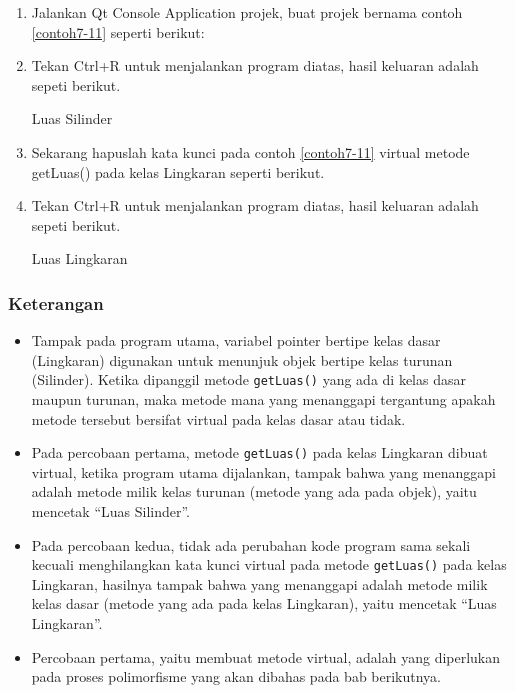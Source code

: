\begin{enumerate}

\item
 Jalankan Qt Console Application projek, buat projek bernama contoh \ref{contoh7-11}
 seperti berikut:




\item
 Tekan Ctrl+R untuk menjalankan program diatas, hasil keluaran adalah
 sepeti berikut.

\begin{lcverbatim}
Luas Silinder
\end{lcverbatim}
\item
 Sekarang hapuslah kata kunci pada contoh \ref{contoh7-11} virtual metode getLuas() pada kelas
 Lingkaran seperti berikut.



\item
 Tekan Ctrl+R untuk menjalankan program diatas, hasil keluaran adalah
 sepeti berikut.


\begin{lcverbatim}
Luas Lingkaran
\end{lcverbatim}
\end{enumerate}
\subsubsection*{Keterangan}

\begin{itemize}

\item
 Tampak pada program utama, variabel pointer bertipe kelas dasar
 (Lingkaran) digunakan untuk menunjuk objek bertipe kelas turunan
 (Silinder). Ketika dipanggil metode \texttt{getLuas()} yang ada di
 kelas dasar maupun turunan, maka metode mana yang menanggapi
 tergantung apakah metode tersebut bersifat virtual pada kelas dasar
 atau tidak.
\item
 Pada percobaan pertama, metode \texttt{getLuas()} pada kelas Lingkaran
 dibuat virtual, ketika program utama dijalankan, tampak bahwa yang
 menanggapi adalah metode milik kelas turunan (metode yang ada pada
 objek), yaitu mencetak ``Luas Silinder''.
\item
 Pada percobaan kedua, tidak ada perubahan kode program sama sekali
 kecuali menghilangkan kata kunci virtual pada metode
 \texttt{getLuas()} pada kelas Lingkaran, hasilnya tampak bahwa yang
 menanggapi adalah metode milik kelas dasar (metode yang ada pada kelas
 Lingkaran), yaitu mencetak ``Luas Lingkaran''.
\item
 Percobaan pertama, yaitu membuat metode virtual, adalah yang
 diperlukan pada proses polimorfisme yang akan dibahas pada bab
 berikutnya.
\end{itemize}

